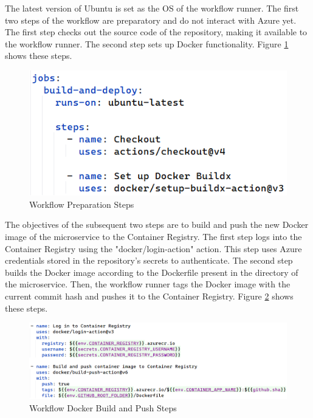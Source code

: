 \documentclass[12pt, reqno, oneside]{amsbook}
\theoremstyle{definition}
\theoremstyle{definition}
\numberwithin{section}{chapter}
\numberwithin{table}{chapter}
\numberwithin{figure}{chapter}
\begin{document}
The latest version of Ubuntu is set as the \ac{OS} of the workflow runner. The first two steps of the workflow are preparatory and do not interact with Azure yet. The first step checks out the source code of the repository, making it available to the workflow runner. The second step sets up Docker functionality. Figure \ref{Figure:GithubWorkflowPreparation} shows these steps.

\begin{figure}[H]
  \centering
  \includegraphics[width=0.7\linewidth]{images/GithubWorkflowPreparation.png}
  \caption{\label{Figure:GithubWorkflowPreparation}Workflow Preparation Steps}
\end{figure}

\pagebreak

The objectives of the subsequent two steps are to build and push the new Docker image of the microservice to the Container Registry. The first step logs into the Container Registry using the "docker/login-action" action. This step uses Azure credentials stored in the repository's secrets to authenticate. The second step builds the Docker image according to the Dockerfile present in the directory of the microservice. Then, the workflow runner tags the Docker image with the current commit hash and pushes it to the Container Registry. Figure \ref{Figure:GithubWorkflowContainerRegistry} shows these steps.

\begin{figure}[H]
  \centering
  \includegraphics[width=1\linewidth]{images/GithubWorkflowContainerRegistry.png}
  \caption{\label{Figure:GithubWorkflowContainerRegistry}Workflow Docker Build and Push Steps}
\end{figure}
\end{document}
